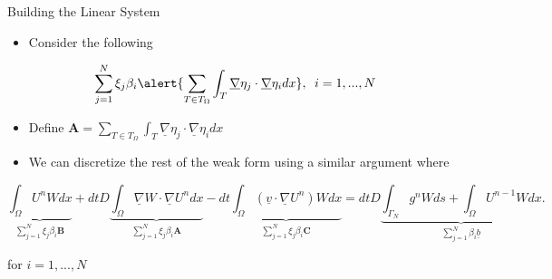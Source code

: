 \documentclass[10pt]{beamer}
\begin{document}
\begin{frame}{Building the Linear System}
\begin{itemize}
\item Consider the following
\end{itemize}
\begin{equation}
\sum_{j=1}^{N} \xi_{j}\beta_{i}\alert{\sum_{T \in T_{\Omega}}\int_{T} \underline{\nabla} \eta_{j} \cdot \underline{\nabla}\eta_{i} dx}, \texttt{ } i=1,...,N
\end{equation}

\begin{itemize}
\item Define $\mathbf{A} = \sum_{T \in T_{\Omega}}\int_{T} \underline{\nabla} \eta_{j} \cdot \underline{\nabla}\eta_{i} dx$
\end{itemize}

\begin{itemize}
\item We can discretize the rest of the weak form using a similar argument where
\end{itemize}

\footnotesize
\begin{equation}
\underbrace{\int_{\Omega}U^{n}W dx}_{\sum_{j=1}^{N} \xi_{j}\beta_{i}\mathbf{B}} +dtD\underbrace{\int_{\Omega}\underline{\nabla}W \cdot \underline{\nabla} U^{n} dx}_{\sum_{j=1}^{N} \xi_{j}\beta_{i}\mathbf{A}}-dt\underbrace{\int_{\Omega}\left(\underline{v}\cdot \underline{\nabla}U^{n}\right)W dx}_{\sum_{j=1}^{N} \xi_{j}\beta_{i}\mathbf{C}}=dtD\underbrace{\int_{\Gamma_{N}}g^{n}W ds+ \int_{\Omega} U^{n-1}W dx}_{\sum_{j=1}^{N} \beta_{i}\underline{b}}.
\end{equation}

\normalsize
for $i=1,...,N$

\end{frame}
\end{document}
